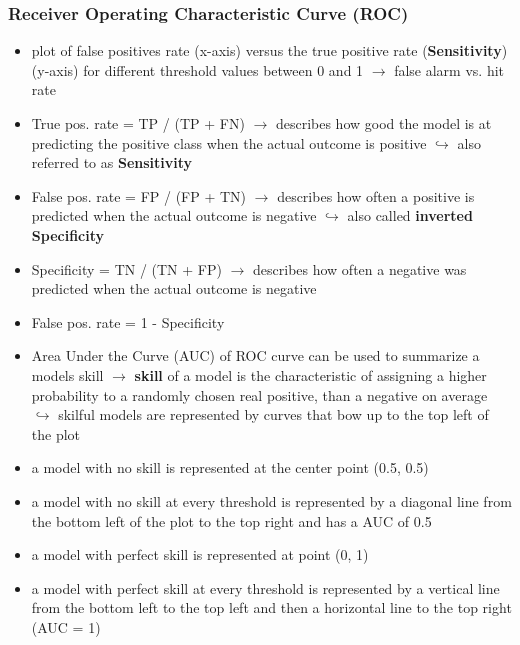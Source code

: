 \documentclass[12pt,a4paper]{article}
\begin{document}
\subsubsection{Receiver Operating Characteristic Curve (ROC)} %
\label{ssub:receiver_operating_characteristic}
\begin{itemize}
  \item plot of false positives rate (x-axis) versus the true positive rate (\textbf{Sensitivity}) (y-axis) for different threshold values between 0 and 1
  \newline \indent $\longrightarrow$ false alarm vs. hit rate
  \item True pos. rate = TP / (TP + FN)
  \newline \indent $\longrightarrow$ describes how good the model is at predicting the positive class when the actual outcome is positive
  \newline \indent $\hookrightarrow$ also referred to as \textbf{Sensitivity}
  \item False pos. rate = FP / (FP + TN)
  \newline \indent $\longrightarrow$ describes how often a positive is predicted when the actual outcome is negative
  \newline \indent $\hookrightarrow$ also called \textbf{inverted Specificity}
  \item Specificity = TN / (TN + FP)
  \newline \indent $\longrightarrow$ describes how often a negative was predicted when the actual outcome is negative
  \item False pos. rate = 1 - Specificity
  \item Area Under the Curve (AUC) of ROC curve can be used to summarize a models skill
  \newline \indent $\longrightarrow$ \textbf{skill} of a model is the characteristic of assigning a higher probability to a randomly chosen real positive, than a negative on average
  \newline \indent $\hookrightarrow$ skilful models are represented by curves that bow up to the top left of the plot
  \item a model with no skill is represented at the center point (0.5, 0.5)
  \item a model with no skill at every threshold is represented by a diagonal line from the bottom left of the plot to the top right and has a AUC of 0.5
  \item a model with perfect skill is represented at point (0, 1)
  \item a model with perfect skill at every threshold is represented by a vertical line from the bottom left to the top left and then a horizontal line to the top right (AUC = 1)
\end{itemize}
\end{document}
